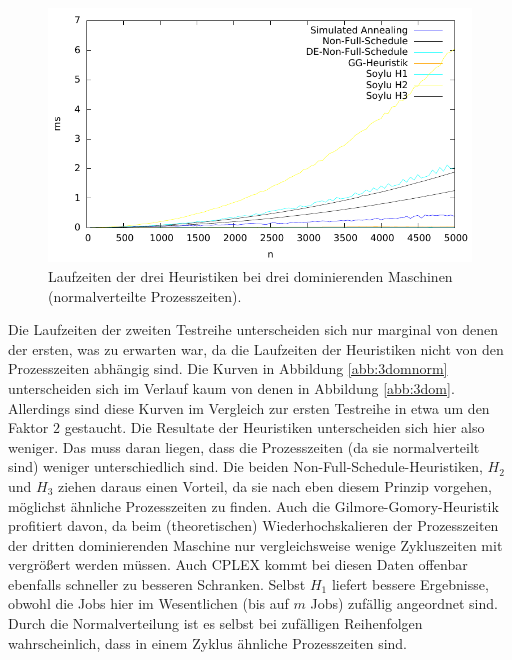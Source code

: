 \documentclass{scrreprt}
\begin{document}
\begin{figure}
    \begin{center}
        \includegraphics[width=.8\textwidth]{../instances/3dom_norm/plottime.pdf}
    \end{center}
    \caption{
        \label{abb:3domnormtime}
        Laufzeiten der drei Heuristiken bei drei dominierenden Maschinen (normalverteilte Prozesszeiten).
    }
\end{figure}

Die Laufzeiten der zweiten Testreihe unterscheiden sich nur marginal von denen der ersten, was zu erwarten war, 
da die Laufzeiten der Heuristiken nicht von den Prozesszeiten abhängig sind.
Die Kurven in Abbildung \ref{abb:3domnorm} unterscheiden sich im Verlauf kaum von denen in Abbildung \ref{abb:3dom}.
Allerdings sind diese Kurven im Vergleich zur ersten Testreihe in etwa um den Faktor $2$ gestaucht.
Die Resultate der Heuristiken unterscheiden sich hier also weniger.
Das muss daran liegen, dass die Prozesszeiten (da sie normalverteilt sind) weniger unterschiedlich sind.
Die beiden Non-Full-Schedule-Heuristiken, $H_2$ und $H_3$ ziehen daraus einen Vorteil, da sie nach eben diesem Prinzip vorgehen, möglichst ähnliche Prozesszeiten zu finden.
Auch die Gilmore-Gomory-Heuristik profitiert davon, da beim (theoretischen) Wiederhochskalieren der Prozesszeiten der dritten dominierenden Maschine 
nur vergleichsweise wenige Zykluszeiten mit vergrößert werden müssen.
Auch CPLEX kommt bei diesen Daten offenbar ebenfalls schneller zu besseren Schranken.
Selbst $H_1$ liefert bessere Ergebnisse, obwohl die Jobs hier im Wesentlichen (bis auf $m$ Jobs) zufällig angeordnet sind.
Durch die Normalverteilung ist es selbst bei zufälligen Reihenfolgen wahrscheinlich, dass in einem Zyklus ähnliche Prozesszeiten sind.
\end{document}
